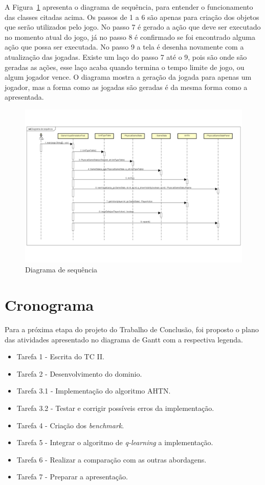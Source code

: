 A Figura~\ref{fig:sequencia} apresenta o diagrama de sequência, para entender o funcionamento das classes citadas acima. Os passos de 1 a 6 são apenas para criação dos objetos que serão utilizados pelo jogo. No passo 7 é gerado a ação que deve ser executado no momento atual do jogo, já no passo 8 é confirmado se foi encontrado alguma ação que possa ser executada. No passo 9 a tela é desenha novamente com a atualização das jogadas. Existe um laço do passo 7 até o 9, pois são onde são geradas as ações, esse laço acaba quando termina o tempo limite de jogo, ou algum jogador vence. O diagrama mostra a geração da jogada para apenas um jogador, mas a forma como as jogadas são geradas é da mesma forma como a apresentada.

  \begin{figure}[ht]
  	\centering
  	\includegraphics[width=1\textwidth]{fig/diagramaSequencia.pdf}
  	\caption{Diagrama de sequência}
  	\label{fig:sequencia}
  \end{figure}

\section{Cronograma}

Para a próxima etapa do projeto do Trabalho de Conclusão, foi proposto o plano das atividades apresentado no diagrama de Gantt com a respectiva legenda.

\begin{itemize}
\item Tarefa 1 - Escrita do TC II.
\item Tarefa 2 - Desenvolvimento do dominio.
\item Tarefa 3.1 - Implementação do algoritmo AHTN.
\item Tarefa 3.2 - Testar e corrigir possíveis erros da implementação.
\item Tarefa 4 - Criação dos \textit{benchmark}.
\item Tarefa 5 - Integrar o algoritmo de \textit{q-learning} a implementação. 
\item Tarefa 6 - Realizar a comparação com as outras abordagens. 
\item Tarefa 7 - Preparar a apresentação. 
\end{itemize}

